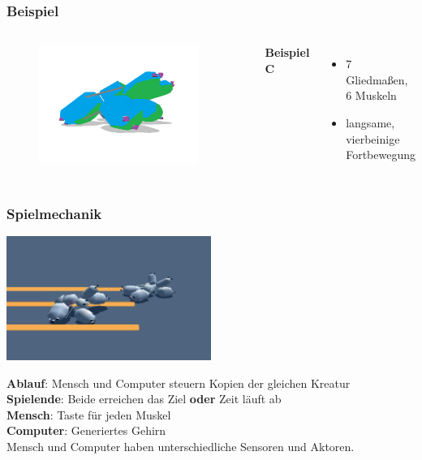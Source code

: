 \documentclass{beamer}
\begin{document}
\begin{frame}
	\frametitle{Beispiel}
	\begin{columns}
		\begin{figure}
			\includegraphics[width=0.9\textwidth]{img/type3.png}
		\end{figure}
		\textbf{Beispiel C}\\
		\begin{itemize}
			\item 7 Gliedmaßen, 6 Muskeln
			\item langsame, vierbeinige Fortbewegung
		\end{itemize}		
	\end{columns}
\end{frame}


\begin{frame}
	\frametitle{Spielmechanik}
	
	\includegraphics[width=0.5\textwidth]{img/games/darwin.png}
	\vspace{1em}
	
	\textbf{Ablauf}: Mensch und Computer steuern Kopien der gleichen Kreatur \pause \\
	\vspace{1em}
	\textbf{Spielende}: Beide erreichen das Ziel \textbf{oder} Zeit läuft ab \pause \\
	\vspace{1em}
	\textbf{Mensch}: Taste für jeden Muskel \\
	\textbf{Computer}: Generiertes Gehirn \pause \\
	\vspace{1em}
	Mensch und Computer haben unterschiedliche Sensoren und Aktoren.
\end{frame}
\end{document}
